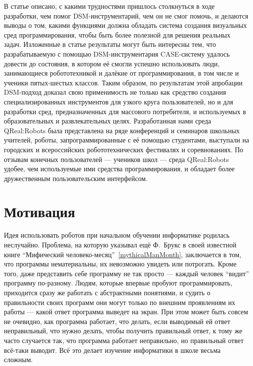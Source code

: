 \documentclass[a4paper]{article}
\begin{document}
В статье описано, с какими трудностями пришлось столкнуться в ходе разработки, чем помог DSM-инструментарий, чем он не смог помочь, и делаются выводы о том, какими функциями должна обладать система создания визуальных сред программирования, чтобы быть более полезной для решения реальных задач. Изложенные в статье результаты могут быть интересны тем, что разрабатываемую с помощью DSM-инструментария CASE-систему удалось довести до состояния, в котором её смогли успешно использовать люди, занимающиеся робототехникой и далёкие от программирования, в том числе и ученики пятых-шестых классов. Таким образом, по результатам этой апробации DSM-подход доказал свою применимость не только как средство создания специализированных инструментов для узкого круга пользователей, но и для разработки сред, предназначенных для массового потребителя, и используемых в образовательных и развлекательных целях. Разработанная нами среда QReal:Robots была представлена на ряде конференций и семинаров школьных учителей, роботы, запрограммированные с её помощью студентами, выступали на городских и всероссийских робототехнических фестивалях и соревнованиях. По отзывам конечных пользователей --- учеников школ --- среда QReal:Robots удобее, чем используемые ими средства программирования, и обладает более дружественным пользовательским интерфейсом.

\section{Мотивация}
Идея использовать роботов при начальном обучении информатике родилась неслучайно. Проблема, на которую указывал ещё Ф.~Брукс в своей известной книге ``Мифический человеко-месяц''~\ref{mythicalManMonth}, заключается в том, что программы нематериальны, их невозможно увидеть или потрогать. Кроме того, даже представить себе программу не так просто --- каждый человек ``видит'' программу по-разному. Людям, которые впервые пробуют программировать, приходится сразу же работать с абстрактными понятиями, и судить о правильности своих программ они могут только по внешним проявлениям их работы --- какой ответ программа выведет на экран. При этом может быть совсем не очевидно, как программа работает, что делать, если выводимый ей ответ неправильный, что нужно делать, чтобы получить правильный ответ, к тому же часто случается так, что программа работает неправильно, но правильный ответ всё-таки выводит. Всё это делает изучение информатики в школе весьма сложным.
\end{document}
